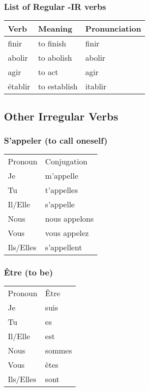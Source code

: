 \subsubsection{List of Regular -IR verbs}
\begin{longtable}{| l | l | l |}
\hline
Verb 		& Meaning 		& Pronunciation	\\
\hline
\endhead
finir       & to finish       & finir       \\	\hline
abolir      & to abolish      & abolir      \\	\hline
agir        & to act          & agir        \\	\hline
\'etablir   & to establish    & itablir     \\	\hline
\end{longtable}


\subsection{Other Irregular Verbs}

\subsubsection{S'appeler (to call oneself)}
\begin{tabular}{| l | l |}
\hline
Pronoun 	& 	Conjugation	\\
Je		&	m'appelle	\\
Tu		&	t'appelles	\\
Il/Elle		&	s'appelle	\\
Nous		&	nous appelons	\\
Vous		&	vous appelez	\\
Ils/Elles	&	s'appellent	\\
\hline
\end{tabular}

\subsubsection{\^Etre (to be)}
\begin{tabular}{| l | l |}
\hline
Pronoun 	& 	\^Etre	\\
Je		&	suis	\\
Tu		&	es	\\
Il/Elle		&	est	\\
Nous		&	sommes	\\
Vous		&	\^etes	\\
Ils/Elles	&	sont	\\
\hline
\end{tabular}

